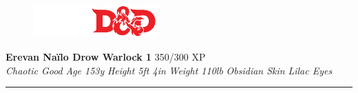 \documentclass[letterpaper]{article}
\newcommand{\e}[1]{\emph{#1}}
\newcommand{\B}[1]{\textbf{#1}}
\begin{document}
\sffamily
\begin{figure}
    \vspace{-1.5em}
    \includegraphics[width=13em]{5e}
\end{figure}
\B{\huge{Erevan Na\"ilo} \Large{Drow Warlock 1}} \hspace{1em} 350/300 XP \\
\e{Chaotic Good} \hspace{1em} \e{Age 153y} \hspace{1em} \e{Height 5ft 4in} \hspace{1em} \e{Weight 110lb} \hspace{1em} \e{Obsidian Skin} \hspace{1em} \e{Lilac Eyes} \par
\hrule
\vspace{1em}
\end{document}
